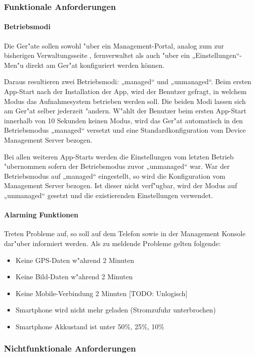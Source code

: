 \subsubsection{Funktionale Anforderungen}
\paragraph{Betriebsmodi}
Die Ger"{a}te sollen sowohl "{u}ber ein Management-Portal, analog zum zur bisherigen Verwaltungsseite , fernverwaltet als auch "{u}ber ein „Einstellungen“-Men"{u} direkt am Ger"{a}t konfiguriert werden können. 

Daraus resultieren zwei Betriebsmodi: „managed“ und „unmanaged“. Beim ersten App-Start nach der Installation der App, wird der Benutzer gefragt, in welchem Modus das Aufnahmesystem betrieben werden soll. Die beiden Modi lassen sich am Ger"{a}t selber jederzeit "{a}ndern. W"{a}hlt der Benutzer beim ersten App-Start innerhalb von 10 Sekunden keinen Modus, wird das Ger"{a}t automatisch in den Betriebsmodus „managed“ versetzt und eine Standardkonfiguration vom Device Management Server bezogen.

Bei allen weiteren App-Starts werden die Einstellungen vom letzten Betrieb "{u}bernommen sofern der Betriebsmodus zuvor „unmanaged“ war. War der Betriebsmodus auf „managed“ eingestellt, so wird die Konfiguration vom Management Server bezogen. Ist dieser nicht verf"{u}gbar, wird der Modus auf „unmanaged“ gesetzt und die existierenden Einstellungen verwendet.

\paragraph{Alarming Funktionen}
Treten Probleme auf, so soll auf dem Telefon sowie in der Management Konsole dar"{u}ber informiert werden. Als zu meldende Probleme gelten folgende:
\begin{itemize}
\item Keine GPS-Daten w"{a}hrend 2 Minuten
\item Keine Bild-Daten w"{a}hrend 2 Minuten
\item Keine Mobile-Verbindung 2 Minuten [TODO: Unlogisch]
\item Smartphone wird nicht mehr geladen (Stromzufuhr unterbrochen)
\item Smartphone Akkustand ist unter 50\%, 25\%, 10\%
\end{itemize}
	
\subsubsection{Nichtfunktionale Anforderungen}

